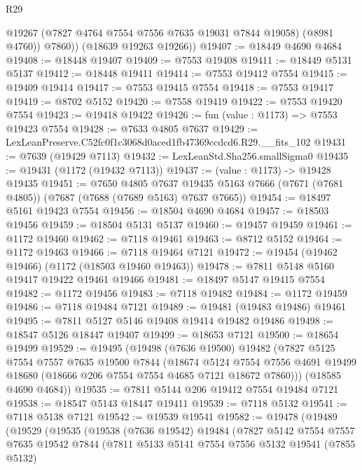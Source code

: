 \begin{lexlean}{R29}
\begin{coremodule}
            @19267
            (@7827 @4764 @7554 @7556 @7635 @19031 @7844 @19058)
            (@8981 @4760))
          @7860))
      (@18639 @19263 @19266))
@19407 := @18449 @4690 @4684
@19408 := @18448 @19407
@19409 := @7553 @19408
@19411 := @18449 @5131 @5137
@19412 := @18448 @19411
@19414 := @7553 @19412 @7554
@19415 := @19409 @19414
@19417 := @7553 @19415 @7554
@19418 := @7553 @19417
@19419 := @8702 @5152
@19420 := @7558 @19419
@19422 := @7553 @19420 @7554
@19423 := @19418 @19422
@19426 := fun (value : @1173) => @7553 @19423 @7554
@19428 := @7633 @4805 @7637
@19429 := LexLeanPreserve.C52fc0f1c3068d0aced1fb47369ccdcd6.R29.__fits_102
@19431 := @7639 (@19429 @7113)
@19432 := LexLeanStd.Sha256.smallSigma0
@19435 := @19431 (@1172 (@19432 @7113))
@19437 := (value : @1173) -> @19428 @19435
@19451 := @7650
    @4805
    @7637
    @19435
    @5163
    @7666
    (@7671 (@7681 @4805))
    (@7687 (@7688 (@7689 @5163) @7637 @7665))
@19454 := @18497 @5161 @19423 @7554
@19456 := @18504 @4690 @4684
@19457 := @18503 @19456
@19459 := @18504 @5131 @5137
@19460 := @19457 @19459
@19461 := @1172 @19460
@19462 := @7118 @19461
@19463 := @8712 @5152
@19464 := @1172 @19463
@19466 := @7118 @19464 @7121
@19472 := @19454 (@19462 @19466) (@1172 (@18503 @19460 @19463))
@19478 := @7811 @5148 @5160 @19417 @19422 @19461 @19466
@19481 := @18497 @5147 @19415 @7554
@19482 := @1172 @19456
@19483 := @7118 @19482
@19484 := @1172 @19459
@19486 := @7118 @19484 @7121
@19489 := @19481 (@19483 @19486) @19461
@19495 := @7811 @5127 @5146 @19408 @19414 @19482 @19486
@19498 := @18547 @5126 @18447 @19407
@19499 := @18653 @7121
@19500 := @18654 @19499
@19529 := @19495
    (@19498
      (@7636 @19500)
      @19482
      (@7827
        @5125
        @7554
        @7557
        @7635
        @19500
        @7844
        (@18674
          @5124
          @7554
          @7556
          @4691
          @19499
          @18680
          (@18666 @206 @7554 @7554 @4685 @7121 @18672 @7860)))
      (@18585 @4690 @4684))
@19535 := @7811 @5144 @206 @19412 @7554 @19484 @7121
@19538 := @18547 @5143 @18447 @19411
@19539 := @7118 @5132
@19541 := @7118 @5138 @7121
@19542 := @19539 @19541
@19582 := @19478
    (@19489
      (@19529
        (@19535
          (@19538
            (@7636 @19542)
            @19484
            (@7827
              @5142
              @7554
              @7557
              @7635
              @19542
              @7844
              (@7811
                @5133
                @5141
                @7554
                @7556
                @5132
                @19541
                (@7855 @5132)

\end{coremodule}
\end{lexlean}
